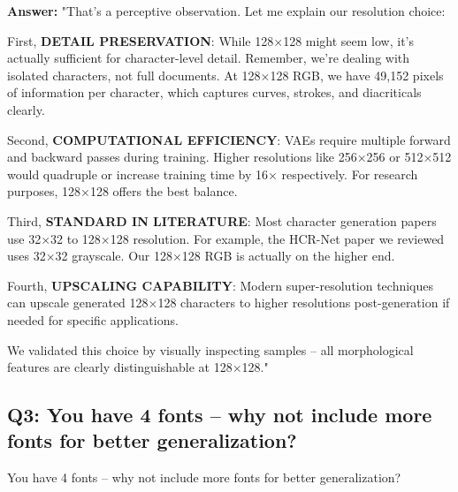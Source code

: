 \documentclass[11pt,a4paper]{article}
\begin{document}
\begin{answerbox}
\textbf{Answer:} "That's a perceptive observation. Let me explain our resolution choice:

First, \textbf{DETAIL PRESERVATION}: While 128×128 might seem low, it's actually sufficient for character-level detail. Remember, we're dealing with isolated characters, not full documents. At 128×128 RGB, we have 49,152 pixels of information per character, which captures curves, strokes, and diacriticals clearly.

Second, \textbf{COMPUTATIONAL EFFICIENCY}: VAEs require multiple forward and backward passes during training. Higher resolutions like 256×256 or 512×512 would quadruple or increase training time by 16× respectively. For research purposes, 128×128 offers the best balance.

Third, \textbf{STANDARD IN LITERATURE}: Most character generation papers use 32×32 to 128×128 resolution. For example, the HCR-Net paper we reviewed uses 32×32 grayscale. Our 128×128 RGB is actually on the higher end.

Fourth, \textbf{UPSCALING CAPABILITY}: Modern super-resolution techniques can upscale generated 128×128 characters to higher resolutions post-generation if needed for specific applications.

We validated this choice by visually inspecting samples -- all morphological features are clearly distinguishable at 128×128."
\end{answerbox}

\subsection{Q3: You have 4 fonts -- why not include more fonts for better generalization?}

\begin{qbox}[title=Question]
You have 4 fonts -- why not include more fonts for better generalization?
\end{qbox}
\end{document}
